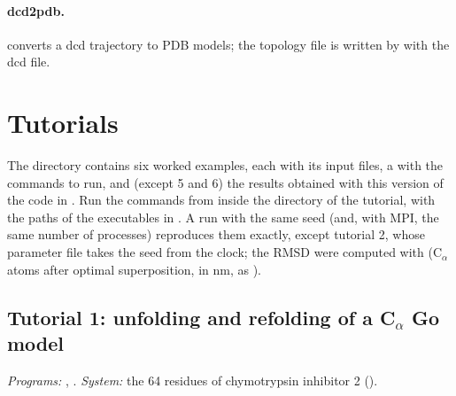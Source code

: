 \documentclass[11pt,a4paper]{article}
\begin{document}
\paragraph{dcd2pdb.}  converts a dcd trajectory to PDB models; the
topology file is written by  with the dcd file.

\section{Tutorials}
\label{sec:tutorials}

The directory  contains six worked examples, each with its
input files, a  with the commands to run, and (except 5 and 6)
the results obtained with this version of the code in . Run
the commands from inside the directory of the tutorial, with the paths of
the executables in . A run with the same seed (and, with MPI, the
same number of processes) reproduces them exactly, except tutorial 2, whose
parameter file takes the seed from the clock; the RMSD were computed
with  (C$_\alpha$ atoms after optimal superposition, in
nm, as ).

\subsection{Tutorial 1: unfolding and refolding of a C\texorpdfstring{$_\alpha$}{-alpha} Go model}
\emph{Programs:} , . \emph{System:} the 64
residues of chymotrypsin inhibitor 2 ().
\end{document}
